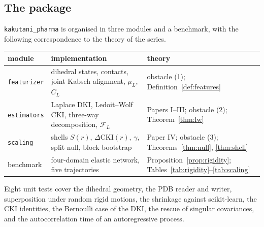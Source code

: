 \documentclass[11pt,reqno]{amsart}
\theoremstyle{plain}
\theoremstyle{definition}
\theoremstyle{remark}
\numberwithin{equation}{section}
\newcommand{\DCKI}{\Delta\mathrm{CKI}}
\newcommand{\pkg}{\texttt{kakutani\_pharma}}
\begin{document}
\subsection*{The package}
\pkg{} is organised in three modules and a benchmark, with the following correspondence to the theory of the series.
\begin{center}\small
\begin{tabular}{@{}p{}p{}p{}@{}}
\toprule
module & implementation & theory \\
\midrule
\texttt{featurizer} & dihedral states, contacts, joint Kabsch alignment, $\mu_L$, $C_L$ & obstacle (1); Definition~\ref{def:features} \\
\texttt{estimators} & Laplace DKI, Ledoit--Wolf CKI, three-way decomposition, $\mathcal F_L$ & Papers I--III; obstacle (2); Theorem~\ref{thm:lw} \\
\texttt{scaling} & shells $S(r)$, $\DCKI(r)$, $\gamma$, split null, block bootstrap & Paper IV; obstacle (3); Theorems~\ref{thm:null}, \ref{thm:shell} \\
benchmark & four-domain elastic network, five trajectories & Proposition~\ref{prop:rigidity}; Tables~\ref{tab:rigidity}--\ref{tab:scaling} \\
\bottomrule
\end{tabular}
\end{center}
Eight unit tests cover the dihedral geometry, the PDB reader and writer, superposition under random rigid motions, the shrinkage against scikit-learn, the CKI identities, the Bernoulli case of the DKI, the rescue of singular covariances, and the autocorrelation time of an autoregressive process.
\end{document}
